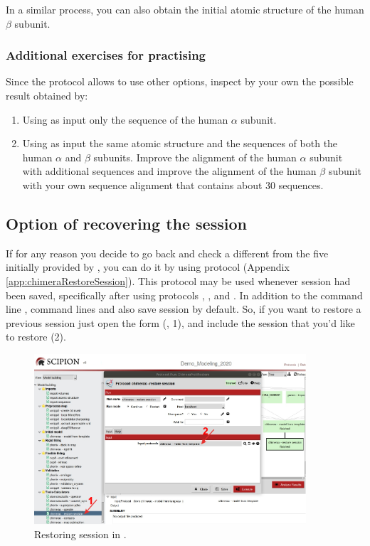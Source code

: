 In a similar process, you can also obtain the initial atomic structure of the human  $\beta$ subunit.\\

\subsubsection*{Additional exercises for practising}
Since the protocol  allows to use other options, inspect by your own the possible result obtained by:\\
\begin{enumerate}
 \item Using as input only the  sequence of the human  $\alpha$ subunit.
 \item Using as input the same atomic structure  and the  sequences of both the human  $\alpha$ and $\beta$ subunits. Improve the alignment of the human  $\alpha$ subunit with additional sequences and improve the alignment of the human  $\beta$ subunit with your own sequence alignment that contains about 30 sequences.
\end{enumerate}


\subsection*{Option of recovering the \chimera session}
If for any reason you decide to go back and check a different  from the five  initially provided by \modeller, you can do it by using  protocol (Appendix \ref{app:chimeraRestoreSession}). This protocol may be used whenever \chimera session had been saved, specifically after using protocols \chimera {}, \chimera {}, \chimera {} and \chimera {}. In addition to the \chimera command line , command lines  and  also save \chimera session by default. So, if you want to restore a previous session just open the form (, 1), and include the session that you'd like to restore (2).

 \begin{figure}[H]
  \centering 
  \captionsetup{width=.7\linewidth} 
  \includegraphics[width=0.90\textwidth]{Images/Fig17}
  \caption{Restoring session in \chimera.}
  \label{fig:restore_session_protocol}
  \end{figure}
